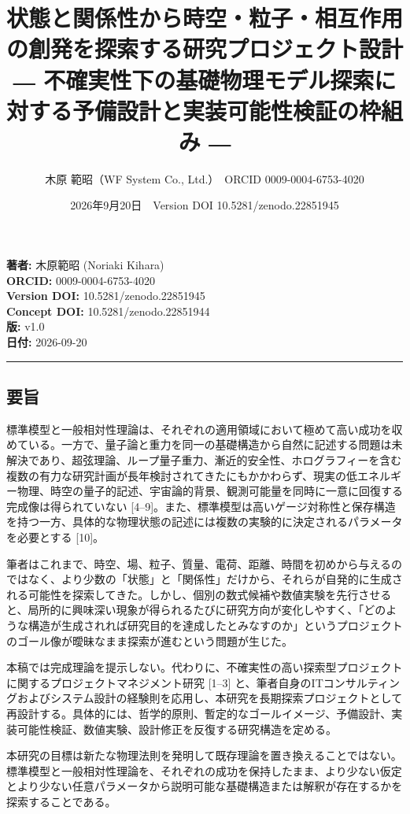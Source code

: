 \documentclass[
  a4paper,
]{ltjsarticle}
\title{状態と関係性から時空・粒子・相互作用の創発を探索する研究プロジェクト設計
― 不確実性下の基礎物理モデル探索に対する予備設計と実装可能性検証の枠組み
―}
\author{木原 範昭（WF System Co., Ltd.）　ORCID 0009-0004-6753-4020}
\date{2026年9月20日　Version DOI 10.5281/zenodo.22851945}
\begin{document}
\maketitle

\textbf{著者:} 木原範昭 (Noriaki Kihara)\\
\textbf{ORCID:} 0009-0004-6753-4020\\
\textbf{Version DOI:} 10.5281/zenodo.22851945\\
\textbf{Concept DOI:} 10.5281/zenodo.22851944\\
\textbf{版:} v1.0\\
\textbf{日付:} 2026-09-20

\begin{center}\rule{0.5\linewidth}{0.5pt}\end{center}

\subsection{要旨}\label{ux8981ux65e8}

標準模型と一般相対性理論は、それぞれの適用領域において極めて高い成功を収めている。一方で、量子論と重力を同一の基礎構造から自然に記述する問題は未解決であり、超弦理論、ループ量子重力、漸近的安全性、ホログラフィーを含む複数の有力な研究計画が長年検討されてきたにもかかわらず、現実の低エネルギー物理、時空の量子的記述、宇宙論的背景、観測可能量を同時に一意に回復する完成像は得られていない
{[}4--9{]}。また、標準模型は高いゲージ対称性と保存構造を持つ一方、具体的な物理状態の記述には複数の実験的に決定されるパラメータを必要とする
{[}10{]}。

筆者はこれまで、時空、場、粒子、質量、電荷、距離、時間を初めから与えるのではなく、より少数の「状態」と「関係性」だけから、それらが自発的に生成される可能性を探索してきた。しかし、個別の数式候補や数値実験を先行させると、局所的に興味深い現象が得られるたびに研究方向が変化しやすく、「どのような構造が生成されれば研究目的を達成したとみなすのか」というプロジェクトのゴール像が曖昧なまま探索が進むという問題が生じた。

本稿では完成理論を提示しない。代わりに、不確実性の高い探索型プロジェクトに関するプロジェクトマネジメント研究
{[}1--3{]}
と、筆者自身のITコンサルティングおよびシステム設計の経験則を応用し、本研究を長期探索プロジェクトとして再設計する。具体的には、哲学的原則、暫定的なゴールイメージ、予備設計、実装可能性検証、数値実験、設計修正を反復する研究構造を定める。

本研究の目標は新たな物理法則を発明して既存理論を置き換えることではない。標準模型と一般相対性理論を、それぞれの成功を保持したまま、より少ない仮定とより少ない任意パラメータから説明可能な基礎構造または解釈が存在するかを探索することである。
\end{document}
